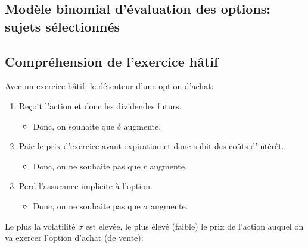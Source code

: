 \documentclass[10pt, french]{article}
\begin{document}
\begin{multicols*}{2}
\section{Modèle binomial d’évaluation des options: sujets sélectionnés}

\subsection{Compréhension de l'exercice hâtif}

Avec un exercice hâtif, le détenteur d'une option {\color{amethyst}d'achat}:
\begin{enumerate}[leftmargin = *]
	\item	Reçoit l'action et donc les dividendes futurs.
		\begin{itemize}
		\item	Donc, on souhaite que $\delta$ \textcolor{amethyst}{augmente}.
		\end{itemize}
	\item	Paie le prix d'exercice avant expiration et donc subit des coûts d'intérêt.
		\begin{itemize}
		\item	Donc, on ne souhaite pas que $r$ \textcolor{amethyst}{augmente}.
		\end{itemize}
	\item	Perd l'assurance implicite à l'option.
		\begin{itemize}
		\item	Donc, on ne souhaite pas que $\sigma$ \textcolor{amethyst}{augmente}.
		\end{itemize}
\end{enumerate}

Le plus la volatilité $\sigma$ est élevée, le plus {\color{amethyst}élevé} {\color{burntsienna}(faible)} le prix de l'action auquel on va exercer l'option {\color{amethyst}d'achat} {\color{burntsienna}(de vente)}:
\begin{center}



\begin{tikzpicture}[x=0.75pt,y=0.75pt,yscale=-1,xscale=1]


\end{tikzpicture}
\end{center}
\end{multicols*}
\end{document}

